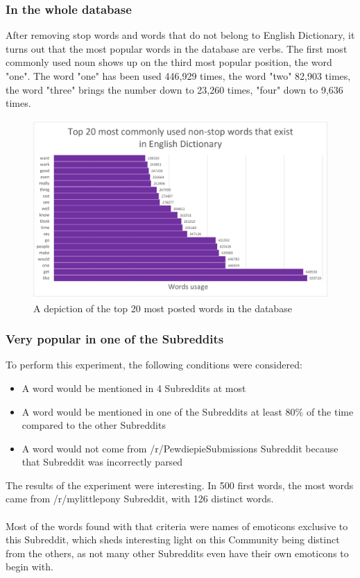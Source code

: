 \documentclass[openany]{article}
\begin{document}
\subsubsection{In the whole database}
After removing stop words and words that do not belong to English Dictionary, it turns out that the most popular words in the database are verbs. The first most commonly used noun shows up on the third most popular position, the word "one". The word "one" has been used 446,929 times, the word "two" 82,903 times, the word "three" brings the number down to 23,260
times, "four" down to 9,636 times.
\begin{figure}[H]
    \centering
    \includegraphics[width=\textwidth]{topusedwords.pdf}
    \caption{A depiction of the top 20 most posted words in the database}
    \label{fig:mesh1}
\end{figure}

\subsubsection{Very popular in one of the Subreddits}
To perform this experiment, the following conditions were considered:
\begin{itemize}
    \item A word would be mentioned in 4 Subreddits at most
    \item A word would be mentioned in one of the Subreddits at least 80\% of the time compared to the other Subreddits
    \item A word would not come from /r/PewdiepieSubmissions Subreddit because that Subreddit was incorrectly parsed
\end{itemize}
The results of the experiment were interesting. In 500 first words, the most words came from /r/mylittlepony Subreddit, with 126 distinct words. \\ \\
Most of the words found with that criteria were names of emoticons exclusive to this Subreddit, which sheds interesting light on this Community being distinct from the others, as not many other Subreddits even have their own emoticons to begin with.
\end{document}
